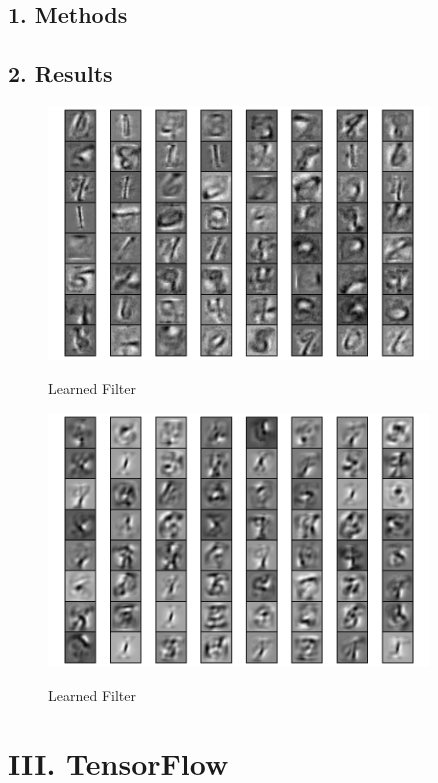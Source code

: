 \subsection*{\large 1. Methods}

\subsection*{\large 2. Results}

\begin{figure}[H]
\centering
\includegraphics[width=0.9\textwidth]{./figures/filter.pdf}\
\caption{\label{fig:single_filter} Learned Filter}
\end{figure}


\begin{figure}[H]
\centering
\includegraphics[width=0.9\textwidth]{./figures/filter_batch.pdf}\
\caption{\label{fig:batch_filter} Learned Filter}
\end{figure}

\newpage
\section*{\Large III. TensorFlow}

